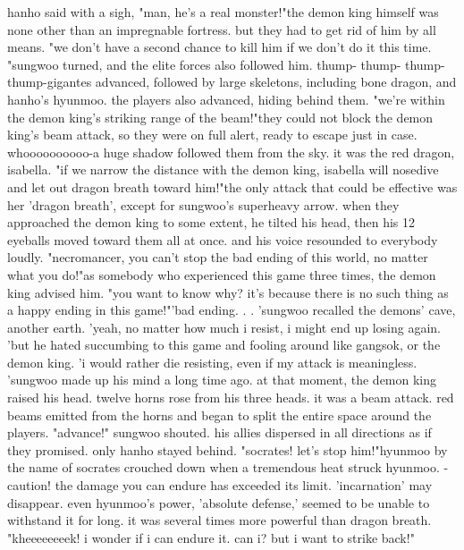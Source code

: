 hanho said with a sigh, "man, he's a real monster!"the demon king himself was none other than an impregnable fortress.
 but they had to get rid of him by all means.
 "we don't have a second chance to kill him if we don't do it this time.
"sungwoo turned, and the elite forces also followed him.
thump- thump- thump- thump-gigantes advanced, followed by large skeletons, including bone dragon, and hanho's hyunmoo.
 the players also advanced, hiding behind them.
"we're within the demon king's striking range of the beam!"they could not block the demon king's beam attack, so they were on full alert, ready to escape just in case.
whoooooooooo-a huge shadow followed them from the sky.
 it was the red dragon, isabella.
"if we narrow the distance with the demon king, isabella will nosedive and let out dragon breath toward him!"the only attack that could be effective was her 'dragon breath', except for sungwoo's superheavy arrow.
 when they approached the demon king to some extent, he tilted his head, then his 12 eyeballs moved toward them all at once.
 and his voice resounded to everybody loudly.
 "necromancer, you can't stop the bad ending of this world, no matter what you do!"as somebody who experienced this game three times, the demon king advised him.
"you want to know why? it's because there is no such thing as a happy ending in this game!"'bad ending.
.
.
'sungwoo recalled the demons' cave, another earth.
'yeah, no matter how much i resist, i might end up losing again.
'but he hated succumbing to this game and fooling around like gangsok, or the demon king.
 'i would rather die resisting, even if my attack is meaningless.
'sungwoo made up his mind a long time ago.
at that moment, the demon king raised his head.
 twelve horns rose from his three heads.
 it was a beam attack.
 red beams emitted from the horns and began to split the entire space around the players.
"advance!" sungwoo shouted.
 his allies dispersed in all directions as if they promised.
 only hanho stayed behind.
"socrates! let's stop him!"hyunmoo by the name of socrates crouched down when a tremendous heat struck hyunmoo.
- caution! the damage you can endure has exceeded its limit.
 'incarnation' may disappear.
even hyunmoo's power, 'absolute defense,' seemed to be unable to withstand it for long.
 it was several times more powerful than dragon breath.
"kheeeeeeeek! i wonder if i can endure it.
 can i? but i want to strike back!"

